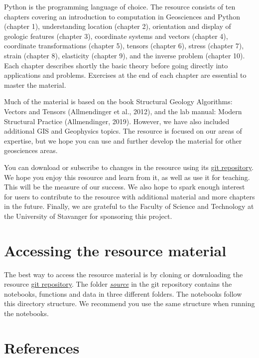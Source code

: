 \documentclass[a4paper , 12pt]{book}
\begin{document}
Python is the programming language of choice. The resource consists of ten chapters covering an introduction to computation in Geosciences and Python (chapter 1), understanding location (chapter 2), orientation and display of geologic features (chapter 3), coordinate systems and vectors (chapter 4), coordinate transformations (chapter 5), tensors (chapter 6), stress (chapter 7), strain (chapter 8), elasticity (chapter 9), and the inverse problem (chapter 10). Each chapter describes shortly the basic theory before going directly into applications and problems. Exercises at the end of each chapter are essential to master the material. 

Much of the material is based on the book Structural Geology Algorithms: Vectors and Tensors (Allmendinger et al., 2012), and the lab manual: Modern Structural Practice (Allmendinger, 2019). However, we have also included additional GIS and Geophysics topics. The resource is focused on our areas of expertise, but we hope you can use and further develop the material for other geosciences areas.

You can download or subscribe to changes in the resource using its \href{https://github.com/nfcd/compGeo}{git repository}. We hope you enjoy this resource and learn from it, as well as use it for teaching. This will be the measure of our success. We also hope to spark enough interest for users to contribute to the resource with additional material and more chapters in the future. Finally, we are grateful to the Faculty of Science and Technology at the University of Stavanger for sponsoring this project.

\section*{Accessing the resource material}

The best way to access the resource material is by cloning or downloading the resource \href{https://github.com/nfcd/compGeo}{git repository}. The folder \href{https://github.com/nfcd/compGeo/blob/master/source}{\textit{source}} in the git repository contains the notebooks, functions and data in three different folders. The notebooks follow this directory structure. We recommend you use the same structure when running the notebooks.

\section*{References}
\end{document}

